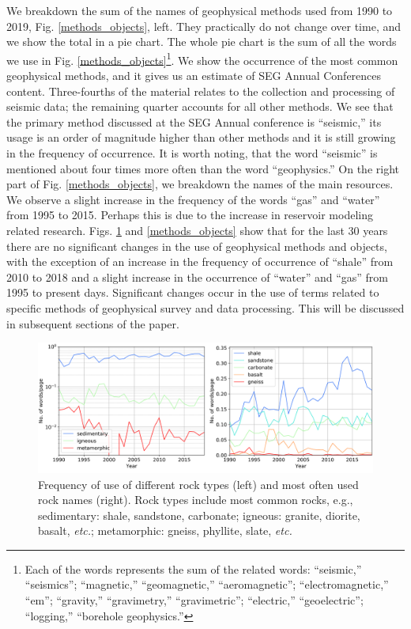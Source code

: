 \documentclass[geosciences,article,submit,moreauthors,pdftex]{Definitions/mdpi}
\begin{document}
We breakdown the sum of the names of geophysical methods used from 1990 to 2019, Fig. \ref{methods_objects}, left. They practically do not change over time, and we show the total in a pie chart. The whole pie chart is the sum of all the words we use in Fig. \ref{methods_objects}\footnote{Each of the words represents the sum of the related words: ``seismic,'' ``seismics''; ``magnetic,'' ``geomagnetic,'' ``aeromagnetic''; ``electromagnetic,'' ``em''; ``gravity,'' ``gravimetry,'' ``gravimetric''; ``electric,'' ``geoelectric''; ``logging,'' ``borehole geophysics.''}. We show the occurrence of the most common geophysical methods, and it gives us an estimate of SEG Annual Conferences content. Three-fourths of the material relates to the collection and processing of seismic data; the remaining quarter accounts for all other methods. We see that the primary method discussed at the SEG Annual conference is ``seismic,'' its usage is an order of magnitude higher than other methods and it is still growing in the frequency of occurrence. It is worth noting, that the word ``seismic'' is mentioned about four times more often than the word ``geophysics.'' On the right part of Fig. \ref{methods_objects}, we breakdown the names of the main resources. We observe a slight increase in the frequency of the words ``gas'' and ``water'' from 1995 to 2015. Perhaps this is due to the increase in reservoir modeling related research. 
Figs. \ref{rocks} and \ref{methods_objects} show that for the last 30 years there are no significant changes in the use of geophysical methods and objects, with the exception of an increase in the frequency of occurrence of ``shale'' from 2010 to 2018 and a slight increase in the occurrence of ``water'' and ``gas'' from 1995 to present days.
Significant changes occur in the use of terms related to specific methods of geophysical survey and data processing. This will be discussed in subsequent sections of the paper.

\begin{figure}[ht!]
\centering
\includegraphics[width=\textwidth]{rocks.png}
\caption{Frequency of use of different rock types (left) and most often used rock names (right). Rock types include most common rocks, e.g., sedimentary: shale, sandstone, carbonate; igneous: granite, diorite, basalt, \textit{etc.}; metamorphic: gneiss, phyllite, slate, \textit{etc.}}
\label{rocks}
\end{figure}
\end{document}
